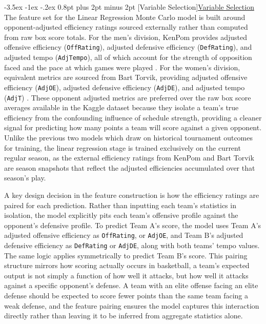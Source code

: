 \documentclass[12pt,leqno]{article}\usepackage[pdftex]{graphicx}\usepackage[dvipsnames]{xcolor}
\makeatletter
\renewcommand\subsubsection{\@startsection {subsubsection}{1}{\z@}%
{-3.5ex \@plus -1ex \@minus -.2ex}%
{0.8pt plus 2pt minus 2pt}%
{\normalfont}}
\newcommand{\usubsubsection}[1]{\subsubsection[#1]{\normalfont\normalfont\underline{#1}}}%
\theoremstyle{remark}
\makeatother
\begin{document}
\usubsubsection{Variable Selection}
The feature set for the Linear Regression Monte Carlo model is built around opponent-adjusted efficiency ratings sourced externally rather than computed from raw box score totals. For the men's division, KenPom provides adjusted offensive efficiency (\texttt{OffRating}), adjusted defensive efficiency (\texttt{DefRating}), and adjusted tempo (\texttt{AdjTempo}), all of which account for the strength of opposition faced and the pace at which games were played \cite{KenPom}. For the women's division, equivalent metrics are sourced from Bart Torvik, providing adjusted offensive efficiency (\texttt{AdjOE}), adjusted defensive efficiency (\texttt{AdjDE}), and adjusted tempo (\texttt{AdjT}) \cite{Torvik}. These opponent adjusted metrics are preferred over the raw box score averages available in the Kaggle dataset because they isolate a team's true efficiency from the confounding influence of schedule strength, providing a cleaner signal for predicting how many points a team will score against a given opponent. Unlike the previous two models which draw on historical tournament outcomes for training, the linear regression stage is trained exclusively on the current regular season, as the external efficiency ratings from KenPom and Bart Torvik are season snapshots that reflect the adjusted efficiencies accumulated over that season's play.

A key design decision in the feature construction is how the efficiency ratings are paired for each prediction. Rather than inputting each team's statistics in isolation, the model explicitly pits each team's offensive profile against the opponent's defensive profile. To predict Team A's score, the model uses Team A's adjusted offensive efficiency as \texttt{OffRating}, or \texttt{AdjOE}, and Team B's adjusted defensive efficiency as \texttt{DefRating} or \texttt{AdjDE}, along with both teams' tempo values. The same logic applies symmetrically to predict Team B's score. This pairing structure mirrors how scoring actually occurs in basketball, a team's expected output is not simply a function of how well it attacks, but how well it attacks against a specific opponent's defense. A team with an elite offense facing an elite defense should be expected to score fewer points than the same team facing a weak defense, and the feature pairing ensures the model captures this interaction directly rather than leaving it to be inferred from aggregate statistics alone.
\end{document}
